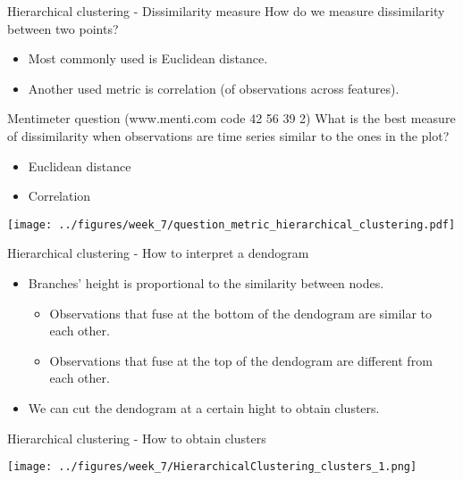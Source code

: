 \documentclass[notes]{beamer}          %
\begin{document}
\begin{frame}{Hierarchical clustering - Dissimilarity measure}
How do we measure dissimilarity between two points?
\begin{itemize}
\item  Most commonly used is Euclidean distance.
\item Another used metric is correlation (of observations across features).
\end{itemize}
\end{frame}

\begin{frame}{Mentimeter question (www.menti.com code 42 56 39 2)}
What is the best measure of dissimilarity when observations are time series similar to the ones in the plot?
\begin{itemize}
\item Euclidean distance
\item Correlation
\end{itemize}
\begin{center}
\texttt{[image: ../figures/week\_7/question\_metric\_hierarchical\_clustering.pdf]}  
\end{center}
\end{frame}

\begin{frame}{Hierarchical clustering - How to interpret a dendogram}
\begin{itemize}
\item Branches' height is proportional to the similarity between nodes.
\begin{itemize}
\item Observations that fuse at the bottom of the dendogram are similar to each other.
\item Observations that fuse at the top of the dendogram are different from each other.
\end{itemize}
\item We can cut the dendogram at a certain hight to obtain clusters.
\end{itemize}
\end{frame}

\begin{frame}{Hierarchical clustering - How to obtain clusters}
\begin{center}
\texttt{[image: ../figures/week\_7/HierarchicalClustering\_clusters\_1.png]}  
\end{center}
\end{frame}
\end{document}
